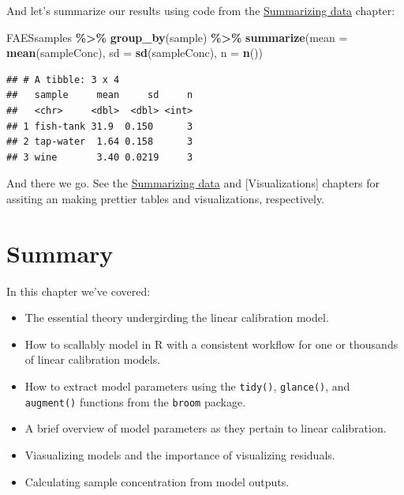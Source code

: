 \documentclass[
]{book}
\newenvironment{Shaded}{\begin{snugshade}}{\end{snugshade}}
\newcommand{\AttributeTok}[1]{\textcolor[rgb]{0.13,0.29,0.53}{#1}}
\newcommand{\FunctionTok}[1]{\textcolor[rgb]{0.13,0.29,0.53}{\textbf{#1}}}
\newcommand{\NormalTok}[1]{#1}
\newcommand{\SpecialCharTok}[1]{\textcolor[rgb]{0.81,0.36,0.00}{\textbf{#1}}}
\providecommand{\tightlist}{%
  \setlength{\itemsep}{0pt}\setlength{\parskip}{0pt}}
\begin{document}
And let's summarize our results using code from the \protect\hyperlink{summarizing-data}{Summarizing data} chapter:

\begin{Shaded}
\begin{Highlighting}[]
\NormalTok{FAESsamples }\SpecialCharTok{\%\textgreater{}\%}
  \FunctionTok{group\_by}\NormalTok{(sample) }\SpecialCharTok{\%\textgreater{}\%}
  \FunctionTok{summarize}\NormalTok{(}\AttributeTok{mean =} \FunctionTok{mean}\NormalTok{(sampleConc),}
            \AttributeTok{sd =} \FunctionTok{sd}\NormalTok{(sampleConc),}
            \AttributeTok{n =} \FunctionTok{n}\NormalTok{())}
\end{Highlighting}
\end{Shaded}

\begin{verbatim}
## # A tibble: 3 x 4
##   sample     mean     sd     n
##   <chr>     <dbl>  <dbl> <int>
## 1 fish-tank 31.9  0.150      3
## 2 tap-water  1.64 0.158      3
## 3 wine       3.40 0.0219     3
\end{verbatim}

And there we go. See the \protect\hyperlink{summarizing-data}{Summarizing data} and {[}Visualizations{]} chapters for assiting an making prettier tables and visualizations, respectively.

\hypertarget{summary-5}{%
\section{Summary}\label{summary-5}}

In this chapter we've covered:

\begin{itemize}
\tightlist
\item
  The essential theory undergirding the linear calibration model.
\item
  How to scallably model in R with a consistent workflow for one or thousands of linear calibration models.
\item
  How to extract model parameters using the \texttt{tidy()}, \texttt{glance()}, and \texttt{augment()} functions from the \texttt{broom} package.
\item
  A brief overview of model parameters as they pertain to linear calibration.
\item
  Viasualizing models and the importance of visualizing residuals.
\item
  Calculating sample concentration from model outputs.
\end{itemize}
\end{document}
